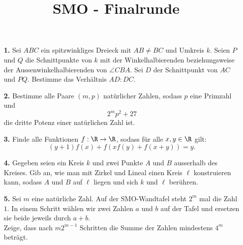\documentclass[language=german,style=exam]{smo}
\title{SMO - Finalrunde}
\begin{document}
\begin{enumerate}

\item[\textbf{1.}] Sei $ABC$ ein spitzwinkliges Dreieck mit $AB\neq BC$ und Umkreis $k$. Seien $P$ und $Q$ die Schnittpunkte von $k$ mit der Winkelhalbierenden beziehungsweise der Aussenwinkelhalbierenden von $\angle CBA$. Sei $D$ der Schnittpunkt von $AC$ und $PQ$. Bestimme das Verhältnis $AD:DC$.

\bigskip

\item[\textbf{2.}] Bestimme alle Paare $(m,p)$ natürlicher Zahlen, sodass $p$ eine Primzahl und
\[2^mp^2+27 \]
die dritte Potenz einer natürlichen Zahl ist.

\bigskip

\item[\textbf{3.}] Finde alle Funktionen $f: \R \rightarrow \R$, sodass für alle $x,y \in \R$ gilt:
\[
(y+1)f(x) + f(xf(y)+f(x+y))=y.
\]

\bigskip

\item[\textbf{4.}] Gegeben seien ein Kreis $k$ und zwei Punkte $A$ und $B$ ausserhalb des Kreises. Gib an, wie man mit Zirkel und Lineal einen Kreis $\ell$ konstruieren kann, sodass $A$ und $B$ auf $\ell$ liegen und sich $k$ und $\ell$ berühren.

\bigskip

\item[\textbf{5.}] Sei $m$ eine natürliche Zahl. Auf der SMO-Wandtafel steht $2^m$ mal die Zahl $1$. In einem Schritt wählen wir zwei Zahlen $a$ und $b$ auf der Tafel und ersetzen sie beide jeweils durch $a+b$.\\
Zeige, dass nach $m2^{m-1}$ Schritten die Summe der Zahlen mindestens $4^m$ beträgt.

\bigskip

\end{enumerate}

\vspace{1cm}

\end{document}
